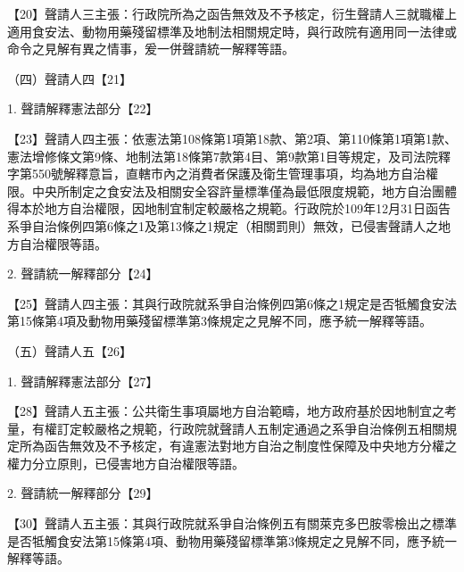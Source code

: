 \documentclass{ctexart} %
\begin{document}
{【20】聲請人三主張：行政院所為之函告無效及不予核定，衍生聲請人三就職權上適用食安法、動物用藥殘留標準及地制法相關規定時，與行政院有適用同一法律或命令之見解有異之情事，爰一併聲請統一解釋等語。

（四）聲請人四【21】

1. 聲請解釋憲法部分【22】

【23】聲請人四主張：依憲法第108條第1項第18款、第2項、第110條第1項第1款、憲法增修條文第9條、地制法第18條第7款第4目、第9款第1目等規定，及司法院釋字第550號解釋意旨，直轄市內之消費者保護及衛生管理事項，均為地方自治權限。中央所制定之食安法及相關安全容許量標準僅為最低限度規範，地方自治團體得本於地方自治權限，因地制宜制定較嚴格之規範。行政院於109年12月31日函告系爭自治條例四第6條之1及第13條之1規定（相關罰則）無效，已侵害聲請人之地方自治權限等語。

2. 聲請統一解釋部分【24】

【25】聲請人四主張：其與行政院就系爭自治條例四第6條之1規定是否牴觸食安法第15條第4項及動物用藥殘留標準第3條規定之見解不同，應予統一解釋等語。

（五）聲請人五【26】

1. 聲請解釋憲法部分【27】

【28】聲請人五主張：公共衛生事項屬地方自治範疇，地方政府基於因地制宜之考量，有權訂定較嚴格之規範，行政院就聲請人五制定通過之系爭自治條例五相關規定所為函告無效及不予核定，有違憲法對地方自治之制度性保障及中央地方分權之權力分立原則，已侵害地方自治權限等語。

2. 聲請統一解釋部分【29】

【30】聲請人五主張：其與行政院就系爭自治條例五有關萊克多巴胺零檢出之標準是否牴觸食安法第15條第4項、動物用藥殘留標準第3條規定之見解不同，應予統一解釋等語。

}
\end{document}
